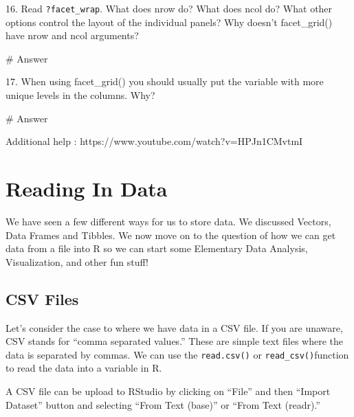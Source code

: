 \documentclass[
  letterpaper,
  DIV=11,
  numbers=noendperiod]{scrreprt}
\newenvironment{Shaded}{\begin{snugshade}}{\end{snugshade}}
\newcommand{\CommentTok}[1]{\textcolor[rgb]{0.37,0.37,0.37}{#1}}
\begin{document}
16. Read \texttt{?facet\_wrap}. What does nrow do? What does ncol do?
What other options control the layout of the individual panels? Why
doesn't facet\_grid() have nrow and ncol arguments?

\begin{Shaded}
\begin{Highlighting}[]
\CommentTok{\# Answer}
\end{Highlighting}
\end{Shaded}

17. When using facet\_grid() you should usually put the variable with
more unique levels in the columns. Why?

\begin{Shaded}
\begin{Highlighting}[]
\CommentTok{\# Answer}
\end{Highlighting}
\end{Shaded}

Additional help : https://www.youtube.com/watch?v=HPJn1CMvtmI


\chapter*{Reading In Data}\label{reading-in-data}


We have seen a few different ways for us to store data. We discussed
Vectors, Data Frames and Tibbles. We now move on to the question of how
we can get data from a file into R so we can start some Elementary Data
Analysis, Visualization, and other fun stuff!

\section*{CSV Files}\label{csv-files}


Let's consider the case to where we have data in a CSV file. If you are
unaware, CSV stands for ``comma separated values.'' These are simple
text files where the data is separated by commas. We can use the
\texttt{read.csv()} or \texttt{read\_csv()}function to read the data
into a variable in R.

A CSV file can be upload to RStudio by clicking on ``File'' and then
``Import Dataset'' button and selecting ``From Text (base)'' or ``From
Text (readr).''
\end{document}
